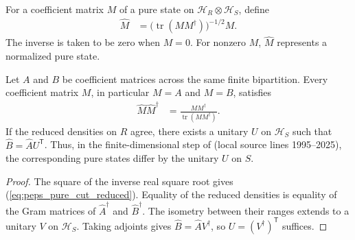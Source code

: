 \begin{definition}%
    \label{def:peps_normalized_pure_cut_matrix}
    \leanok
    For a coefficient matrix $M$ of a pure state on
    $\mathcal H_R\otimes\mathcal H_S$, define
    \begin{align}
        \widehat M & =\bigl(\operatorname{tr}(MM^\dagger)\bigr)^{-1/2}M.
        \label{eq:peps_normalized_pure_cut}
    \end{align}
    The inverse is taken to be zero when $M=0$. For nonzero $M$,
    $\widehat M$ represents a normalized pure state.
\end{definition}

\begin{lemma}%
    \label{thm:peps_pure_cut_local_equivalence}
    \leanok
    Let $A$ and $B$ be coefficient matrices across the same finite
    bipartition. Every coefficient matrix $M$, in particular $M=A$ and
    $M=B$, satisfies
    \begin{align}
        \widehat M\widehat M^\dagger
         & =\frac{MM^\dagger}{\operatorname{tr}(MM^\dagger)}.
        \label{eq:peps_pure_cut_reduced}
    \end{align}
    If the reduced densities on $R$ agree, there exists a unitary $U$
    on $\mathcal H_S$ such that $\widehat B=\widehat A U^{\mathsf T}$.
    Thus, in the finite-dimensional step of
    \cite[Theorem~6.7 and Corollary~6.8]{Schuch2010PEPS} (local source
    lines 1995--2025), the corresponding pure states differ by the unitary $U$
    on $S$.
\end{lemma}

\begin{proof}\leanok
    The square of the inverse real square root gives
    (\ref{eq:peps_pure_cut_reduced}). Equality of the reduced densities
    is equality of the Gram matrices of $\widehat A^\dagger$ and
    $\widehat B^\dagger$. The isometry between their ranges extends
    to a unitary $V$ on $\mathcal H_S$. Taking adjoints gives
    $\widehat B=\widehat A V^\dagger$, so $U=(V^\dagger)^{\mathsf T}$ suffices.
\end{proof}

